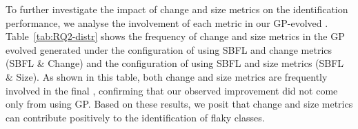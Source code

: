 To further investigate the impact of change and size metrics on the identification performance, we analyse the involvement of each metric in our GP-evolved \formulas. 
Table~\ref{tab:RQ2-distr} shows the frequency of change and size metrics in the GP evolved \formulas generated under the configuration of using SBFL and change metrics (\ie SBFL \& Change) and the configuration of using SBFL and size metrics (\ie SBFL \& Size). 
As shown in this table, both change and size metrics are frequently involved in the final \formulas, confirming that our observed improvement did not come only from using GP.
Based on these results, we posit that change and size metrics can contribute positively to the identification of flaky classes. 



